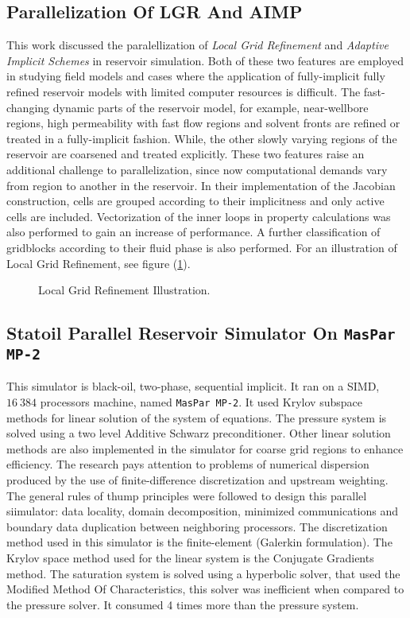 \documentclass[barcolor=BrickRed,nocopyright,nolists]{asmejour}
\begin{document}
\subsection{Parallelization Of LGR And AIMP}
This work discussed the paralellization of \textit{Local Grid Refinement} and \textit{Adaptive Implicit Schemes} in reservoir simulation. Both of these two features are employed in studying field models and cases where the application of fully-implicit fully refined reservoir models
with limited computer resources is difficult. The fast-changing dynamic parts of the reservoir model, for example, near-wellbore regions, high permeability with fast flow regions and solvent fronts are refined or treated in a fully-implicit fashion. While, the other slowly varying regions
of the reservoir are coarsened and treated explicitly. These two features raise an additional challenge to parallelization, since now computational demands vary from region to another in the reservoir. In their implementation of the Jacobian construction, cells are grouped according to their
implicitness and only active cells are included. Vectorization of the inner loops in property calculations was also performed to gain an increase of performance. A further classification of gridblocks according to their fluid phase is also performed. For an illustration of Local Grid Refinement,
see figure (\ref{lgr}).
\begin{figure}[h]
	\centering\scalebox{0.5}{}
	\caption{Local Grid Refinement Illustration.}
	\label{lgr}
\end{figure}

\subsection{Statoil Parallel Reservoir Simulator On \texttt{MasPar MP-2}}
This simulator is black-oil, two-phase, sequential implicit. It ran on a SIMD, $16 \ 384$ processors machine, named \texttt{MasPar MP-2}. It used Krylov subspace methods for linear solution of the system of equations. The pressure system is solved using a two level Additive Schwarz preconditioner. Other linear solution
methods are also implemented in the simulator for coarse grid regions to enhance efficiency. The research pays attention to problems of numerical dispersion produced by the use of finite-difference discretization and upstream weighting. The general rules of thump principles were followed to design this parallel siimulator:
data locality, domain decomposition, minimized communications and boundary data duplication between neighboring processors. The discretization method used in this simulator is the finite-element (Galerkin formulation). The Krylov space method used for the linear system is the Conjugate Gradients method. The saturation system
is solved using a hyperbolic solver, that used the Modified Method Of Characteristics, this solver was inefficient when compared to the pressure solver. It consumed 4 times more than the pressure system. 
\end{document}
